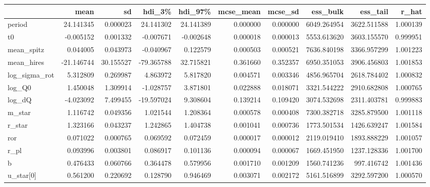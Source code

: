 \begin{tabular}{lrrrrrrrrr}
\toprule
{} &        mean &         sd &      hdi\_3\% &     hdi\_97\% &  mcse\_mean &   mcse\_sd &     ess\_bulk &     ess\_tail &     r\_hat \\
\midrule
period        &   24.141345 &   0.000023 &   24.141302 &   24.141389 &   0.000000 &  0.000000 &  6049.264954 &  3622.511588 &  1.000139 \\
t0            &   -0.005152 &   0.001332 &   -0.007671 &   -0.002648 &   0.000018 &  0.000013 &  5553.613620 &  3603.155570 &  0.999951 \\
mean\_spitz    &    0.044005 &   0.043973 &   -0.040967 &    0.122579 &   0.000503 &  0.000521 &  7636.840198 &  3366.957299 &  1.001223 \\
mean\_hires    &  -21.146744 &  30.155527 &  -79.365788 &   32.715821 &   0.361660 &  0.352357 &  6950.351053 &  3906.456803 &  1.001853 \\
log\_sigma\_rot &    5.312809 &   0.269987 &    4.863972 &    5.817820 &   0.004571 &  0.003346 &  4856.965704 &  2618.784402 &  1.000832 \\
log\_Q0        &    1.450048 &   1.309914 &   -1.028757 &    3.871801 &   0.022888 &  0.018071 &  3321.544222 &  2910.682808 &  1.000765 \\
log\_dQ        &   -4.023092 &   7.499455 &  -19.597024 &    9.308604 &   0.139214 &  0.109420 &  3074.532698 &  2311.403781 &  0.999883 \\
m\_star        &    1.116742 &   0.049356 &    1.021544 &    1.208364 &   0.000578 &  0.000408 &  7300.382718 &  3285.879500 &  1.001118 \\
r\_star        &    1.323166 &   0.043237 &    1.242865 &    1.404738 &   0.001041 &  0.000736 &  1773.501534 &  1426.639247 &  1.001584 \\
ror           &    0.071022 &   0.000765 &    0.069592 &    0.072459 &   0.000017 &  0.000012 &  2119.019410 &  1893.888229 &  1.001057 \\
r\_pl          &    0.093996 &   0.003801 &    0.086917 &    0.101136 &   0.000094 &  0.000067 &  1669.451950 &  1237.128336 &  1.001700 \\
b             &    0.476433 &   0.060766 &    0.364478 &    0.579956 &   0.001710 &  0.001209 &  1560.741236 &   997.416742 &  1.001436 \\
u\_star[0]     &    0.561200 &   0.220692 &    0.128790 &    0.946469 &   0.003071 &  0.002172 &  5161.516899 &  3292.597200 &  1.000570 \\

\end{tabular}
